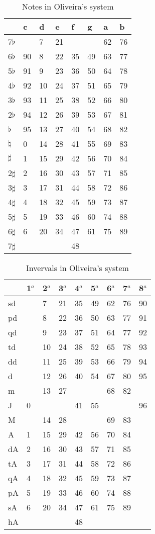 \documentclass{article}
\begin{document}
\begin{table}
  \centering
  \begin{tabular}{l|lllllll}
               & c & d& e& f& g& a& b \\
    \hline
    7$\flat$   &   & 7&21&  &  &62&76 \\
    6$\flat$   & 90& 8&22&35&49&63&77 \\
    5$\flat$   & 91& 9&23&36&50&64&78 \\
    4$\flat$   & 92&10&24&37&51&65&79 \\
    3$\flat$   & 93&11&25&38&52&66&80 \\
    2$\flat$   & 94&12&26&39&53&67&81 \\
    $\flat$    & 95&13&27&40&54&68&82 \\
    $\natural$ &  0&14&28&41&55&69&83 \\
    $\sharp$   &  1&15&29&42&56&70&84 \\
    2$\sharp$  &  2&16&30&43&57&71&85 \\
    3$\sharp$  &  3&17&31&44&58&72&86 \\
    4$\sharp$  &  4&18&32&45&59&73&87 \\
    5$\sharp$  &  5&19&33&46&60&74&88 \\
    6$\sharp$  &  6&20&34&47&61&75&89 \\
    7$\sharp$  &   &  &  &48&  &  &   \\
  \end{tabular}
  \caption{Notes in Oliveira's system}
  \label{tab:jama-notas}
\end{table}

\begin{table}
  \centering
  \begin{tabular}{l|llllllll}
    & 1$^{a}$& 2$^{a}$& 3$^{a}$& 4$^{a}$& 5$^{a}$& 6$^{a}$& 7$^{a}$& 8$^{a}$ \\
    \hline
    sd  &  & 7&21&35&49&62&76&90 \\
    pd  &  & 8&22&36&50&63&77&91 \\
    qd  &  & 9&23&37&51&64&77&92 \\
    td  &  &10&24&38&52&65&78&93 \\
    dd  &  &11&25&39&53&66&79&94 \\
    d   &  &12&26&40&54&67&80&95 \\
    m   &  &13&27&  &  &68&82&   \\
    J   & 0&  &  &41&55&  &  &96 \\
    M   &  &14&28&  &  &69&83&   \\
    A   & 1&15&29&42&56&70&84&   \\
    dA  & 2&16&30&43&57&71&85&   \\
    tA  & 3&17&31&44&58&72&86&   \\
    qA  & 4&18&32&45&59&73&87&   \\
    pA  & 5&19&33&46&60&74&88&   \\
    sA  & 6&20&34&47&61&75&89&   \\
    hA  &  &  &  &48&  &  &  &   
  \end{tabular}
  \caption{Invervals in Oliveira's system}
  \label{tab:jama-intervalos}
\end{table}
\end{document}

